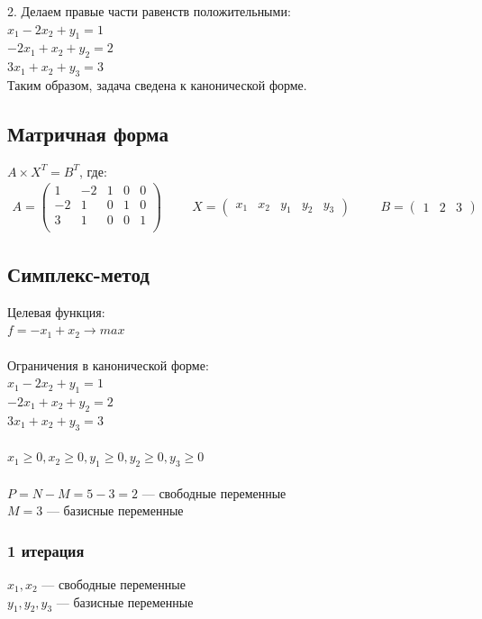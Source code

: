 \documentclass[14pt,a4paper,fleqn]{extarticle}
\begin{document}
2. Делаем правые части равенств положительными:\\
$x_1 - 2x_2 + y_1 = 1$\\
$-2x_1 + x_2 + y_2 = 2$\\
$3x_1 + x_2 + y_3 = 3$\\

Таким образом, задача сведена к канонической форме.

\subsection*{Матричная форма}
$A \times X^T = B^T$, где:
\begin{align*}
	A = \begin{pmatrix}
		1 & -2 & 1 & 0 & 0\\
		-2 & 1 & 0 & 1 & 0\\
		3 & 1 & 0 & 0 & 1\\
		\end{pmatrix}
	\hspace{1cm}
	X = \begin{pmatrix}
		x_1 & x_2 & y_1 & y_2 & y_3
	\end{pmatrix}
	\hspace{1cm}
	B = \begin{pmatrix}
		1 & 2 & 3
	\end{pmatrix}
\end{align*}
\newpage
\subsection*{Симплекс-метод}
Целевая функция:\\
$f = -x_1 + x_2 \longrightarrow max$\\\\
Ограничения в канонической форме:\\
$x_1 - 2x_2 + y_1 = 1$\\
$-2x_1 + x_2 + y_2 = 2$\\
$3x_1 + x_2 + y_3 = 3$\\\\
$x_1 \geq 0, x_2 \geq 0, y_1 \geq 0, y_2 \geq 0, y_3 \geq 0$\\\\
$P = N - M = 5 - 3 = 2$ --- свободные переменные\\
$M = 3$ --- базисные переменные
\subsubsection*{1 итерация}
$x_1, x_2$ --- свободные переменные\\
$y_1, y_2, y_3$ --- базисные переменные\\
\end{document}
